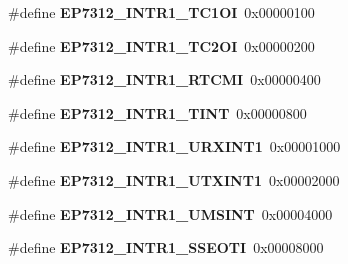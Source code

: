 \begin{DoxyCompactItemize}
\#define {\bfseries E\+P7312\+\_\+\+I\+N\+T\+R1\+\_\+\+T\+C1\+OI}~0x00000100
\item 
\mbox{\label{group__edb7312__registers_ga9eab7cee7e16d984ae8d32351afde15a}} 
\#define {\bfseries E\+P7312\+\_\+\+I\+N\+T\+R1\+\_\+\+T\+C2\+OI}~0x00000200
\item 
\mbox{\label{group__edb7312__registers_gab75f5b889fd73549f6d6b41e34a66b5e}} 
\#define {\bfseries E\+P7312\+\_\+\+I\+N\+T\+R1\+\_\+\+R\+T\+C\+MI}~0x00000400
\item 
\mbox{\label{group__edb7312__registers_ga59bf2e603091ef3af71b117e1c24f928}} 
\#define {\bfseries E\+P7312\+\_\+\+I\+N\+T\+R1\+\_\+\+T\+I\+NT}~0x00000800
\item 
\mbox{\label{group__edb7312__registers_ga8a3f6f10c7cd7fd633e7b5e836557b41}} 
\#define {\bfseries E\+P7312\+\_\+\+I\+N\+T\+R1\+\_\+\+U\+R\+X\+I\+N\+T1}~0x00001000
\item 
\mbox{\label{group__edb7312__registers_ga5cada1abbaab92af50dce272279bc149}} 
\#define {\bfseries E\+P7312\+\_\+\+I\+N\+T\+R1\+\_\+\+U\+T\+X\+I\+N\+T1}~0x00002000
\item 
\mbox{\label{group__edb7312__registers_gabc95a628973d804626b2dc89d6978d5f}} 
\#define {\bfseries E\+P7312\+\_\+\+I\+N\+T\+R1\+\_\+\+U\+M\+S\+I\+NT}~0x00004000
\item 
\mbox{\label{group__edb7312__registers_ga9b5c17efb9b9ce86dc4368e98e2ebc0c}} 
\#define {\bfseries E\+P7312\+\_\+\+I\+N\+T\+R1\+\_\+\+S\+S\+E\+O\+TI}~0x00008000
\end{DoxyCompactItemize}
